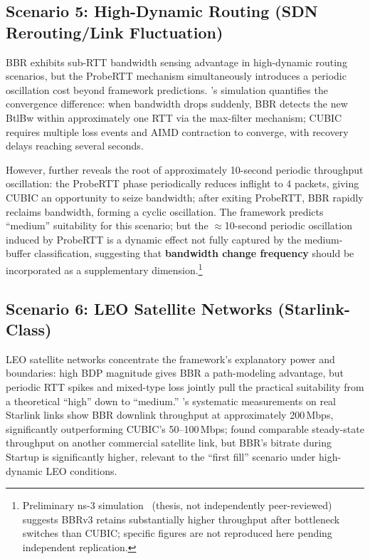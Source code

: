 \documentclass[a4paper,fleqn]{cas-sc}
\begin{document}
\FloatBarrier

\subsection{Scenario 5: High-Dynamic Routing (SDN Rerouting/Link Fluctuation)}
\label{sec:sdn}

BBR exhibits sub-RTT bandwidth sensing advantage in high-dynamic routing scenarios,
but the ProbeRTT mechanism simultaneously introduces a periodic oscillation cost
beyond framework predictions. \citet{miyazawa2018cyclic}'s simulation quantifies
the convergence difference: when bandwidth drops suddenly, BBR detects the new
BtlBw within approximately one RTT via the max-filter mechanism; CUBIC requires
multiple loss events and AIMD contraction to converge, with recovery delays
reaching several seconds.

However, \citet{miyazawa2020mechanism} further reveals the root of approximately
10-second periodic throughput oscillation: the ProbeRTT phase periodically reduces
inflight to 4 packets, giving CUBIC an opportunity to seize bandwidth; after
exiting ProbeRTT, BBR rapidly reclaims bandwidth, forming a cyclic oscillation.
The framework predicts ``medium'' suitability for this scenario; but the
$\approx$10-second periodic oscillation induced by ProbeRTT is a dynamic effect
not fully captured by the medium-buffer classification, suggesting that
\textbf{bandwidth change frequency} should be incorporated as a supplementary
dimension.\footnote{Preliminary ns-3 simulation~\citep{sologon2025thesis} (thesis, not
independently peer-reviewed) suggests BBRv3 retains substantially higher
throughput after bottleneck switches than CUBIC; specific figures are not
reproduced here pending independent replication.}

\subsection{Scenario 6: LEO Satellite Networks (Starlink-Class)}
\label{sec:leo}

LEO satellite networks concentrate the framework's explanatory power and
boundaries: high BDP magnitude gives BBR a path-modeling advantage, but periodic
RTT spikes and mixed-type loss jointly pull the practical suitability from a
theoretical ``high'' down to ``medium.'' \citet{deutschmann2023starlink}'s
systematic measurements on real Starlink links show BBR downlink throughput at
approximately 200\,Mbps, significantly outperforming CUBIC's 50--100\,Mbps;
\citet{claypool2021satellite} found comparable steady-state throughput on another
commercial satellite link, but BBR's bitrate during Startup is significantly
higher, relevant to the ``first fill'' scenario under high-dynamic LEO conditions.
\end{document}
